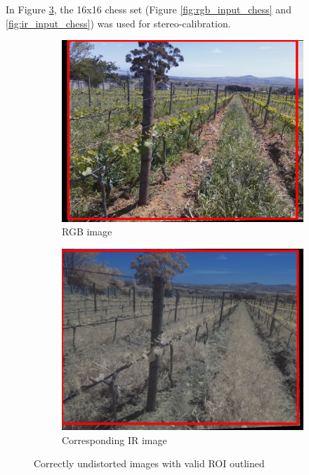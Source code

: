 In Figure \ref{fig:undistorted_roi}, the 16x16 chess set (Figure \ref{fig:rgb_input_chess} and \ref{fig:ir_input_chess}) was used for stereo-calibration.

\begin{figure}[H]
\begin{subfigure}{0.5\textwidth}
\centering
\includegraphics[scale=0.17]{images/rgb_undistorted.jpg}
\caption{RGB image}
\label{fig:rgb_undistorted}
\end{subfigure}
\begin{subfigure}{0.5\textwidth}
\centering
\includegraphics[scale=0.17]{images/ir_undistorted.jpg}
\caption{Corresponding IR image}
\label{fig:ir_undistorted}
\end{subfigure}
\caption{Correctly undistorted images with valid ROI outlined}
\label{fig:undistorted_roi}
\end{figure}
